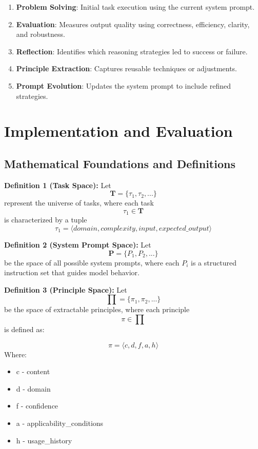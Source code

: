 \documentclass[10pt,a4paper,twocolumn]{article}
\begin{document}
\begin{enumerate}
    \item \textbf{Problem Solving}: Initial task execution using the current system prompt.
    \item \textbf{Evaluation}: Measures output quality using correctness, efficiency, clarity, and robustness.
    \item \textbf{Reflection}: Identifies which reasoning strategies led to success or failure.
    \item \textbf{Principle Extraction}: Captures reusable techniques or adjustments.
    \item \textbf{Prompt Evolution}: Updates the system prompt to include refined strategies.
\end{enumerate}





\section{{Implementation and Evaluation} }



\subsection{Mathematical Foundations and Definitions}

\textbf{Definition 1 (Task Space):} 
Let \[\textbf{T} = \{\tau_1, \tau_2, ...\}\] represent the universe of tasks, where each task \[\tau_1 \in \textbf{T}\] is characterized by a tuple \[\tau_1 = ⟨domain, complexity, input, expected\_output⟩\]


\textbf{Definition 2 (System Prompt Space):} 
Let \[\textbf{P} = \{P_1, P_2, ...\}\] be the space of all possible system prompts, where each $P_i$  is a structured instruction set that guides model behavior.


\textbf{Definition 3 (Principle Space):} 
Let \[\prod = \{\pi_1, \pi_2, ... \} \] be the space of extractable principles, where each principle \[\pi \in \prod\] is defined as:

\[\pi = ⟨c, d, f, a, h⟩ \]
Where:

\begin{itemize}
    \item c - content
    \item d - domain
    \item f - confidence
    \item a - applicability\_conditions
    \item h - usage\_history
\end{itemize}
\end{document}
